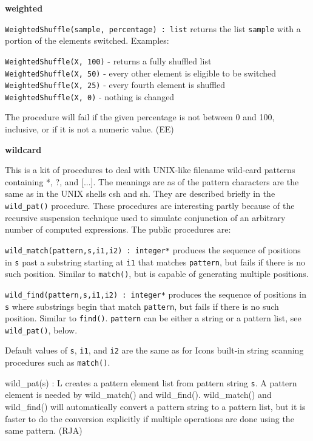 {\sffamily\bfseries
weighted}

\texttt{WeightedShuffle(sample, percentage) : list} returns the list
\texttt{sample} with a portion of the elements switched. Examples:

\texttt{WeightedShuffle(X, 100)} - returns a fully shuffled list\\
\texttt{WeightedShuffle(X, 50)} - every other element is eligible to be
switched\\
\texttt{WeightedShuffle(X, 25)} - every fourth element is
shuffled\\
\texttt{WeightedShuffle(X, 0)} - nothing is changed

The procedure will fail if the given percentage is not between 0 and
100, inclusive, or if it is not a numeric value. (EE)

{\sffamily\bfseries
wildcard}

This is a kit of procedures to deal with UNIX-like filename
wild-card patterns containing *, ?, and
[...]. The meanings are as of the pattern characters are the same as in
the UNIX shells csh and sh. They are described briefly in the
\texttt{wild\_pat()} procedure. These procedures are interesting partly
because of the {\textquotedbl}recursive suspension{\textquotedbl}
technique used to simulate conjunction of an arbitrary number of
computed expressions. The public procedures are:

\texttt{wild\_match(pattern,s,i1,i2) : integer*} produces the sequence
of positions in \texttt{s} past a substring starting at \texttt{i1}
that matches \texttt{pattern}, but fails if there is no such position.
Similar to \texttt{match()}, but is capable of generating multiple
positions.

\texttt{wild\_find(pattern,s,i1,i2) : integer*} produces the sequence of
positions in \texttt{s} where substrings begin that match
\texttt{pattern}, but fails if there is no such position. Similar to
\texttt{find()}. \texttt{pattern} can be either a string or a pattern
list, see \texttt{wild\_pat()}, below.

Default values of \texttt{s}, \texttt{i1}, and \texttt{i2} are the same
as for Icon{\textquotesingle}s built-in string scanning procedures such
as \texttt{match()}.

\textsf{wild\_pat(s) : L} creates a pattern element list from pattern
string \texttt{s}. A pattern element is needed by
\textsf{wild\_match()} and \textsf{wild\_find()}.
\textsf{wild\_match()} and \textsf{wild\_find()} will automatically
convert a pattern string to a pattern list, but it is faster to do the
conversion explicitly if multiple operations are done using the same
pattern. (RJA)

